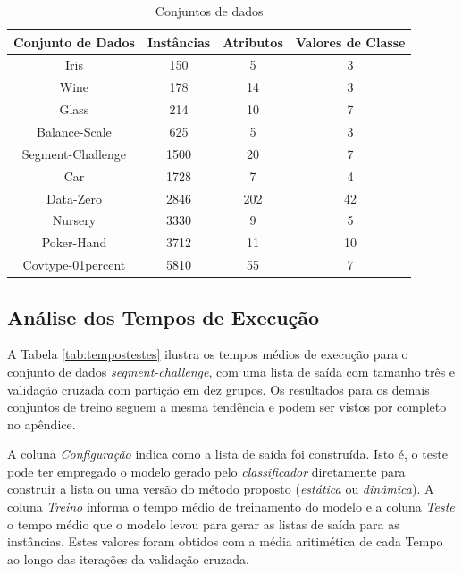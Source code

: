 \begin{table}[h!]
  \begin{center}
    \begin{tabular}{cccc}
      \hline
      \textbf{Conjunto de Dados} & \textbf{Instâncias} & \textbf{Atributos} & \textbf{Valores de Classe} \\
      \hline

      Iris & 150 & 5 & 3 \\
      Wine & 178 & 14 & 3 \\ 
      Glass & 214 & 10 & 7 \\
      Balance-Scale & 625 & 5 & 3 \\
      Segment-Challenge & 1500 & 20 & 7 \\
      Car & 1728 & 7 & 4 \\
      Data-Zero & 2846 & 202 & 42 \\
      Nursery & 3330 & 9 & 5 \\
      Poker-Hand & 3712 & 11 & 10 \\      
      Covtype-01percent & 5810 & 55 & 7 \\

      \hline
    \end{tabular}
    \caption{Conjuntos de dados}
    \label{tab:datasets}
  \end{center}
\end{table}

\subsection{Análise dos Tempos de Execução}

A Tabela \ref{tab:tempostestes} ilustra os tempos médios de execução para o conjunto de dados \textit{segment-challenge}, com uma lista de saída com tamanho três e validação cruzada com partição em dez grupos.
Os resultados para os demais conjuntos de treino seguem a mesma tendência e podem ser vistos por completo no apêndice.

A coluna \textit{Configuração} indica como a lista de saída foi construída.
Isto é, o teste pode ter empregado o modelo gerado pelo \textit{classificador} diretamente para construir a lista ou uma versão do método proposto (\textit{estática} ou \textit{dinâmica}).
A coluna \textit{Treino} informa o tempo médio de treinamento do modelo e a coluna \textit{Teste} o tempo médio que o modelo levou para gerar as listas de saída para as instâncias.
Estes valores foram obtidos com a média aritimética de cada Tempo ao longo das iterações da validação cruzada.

